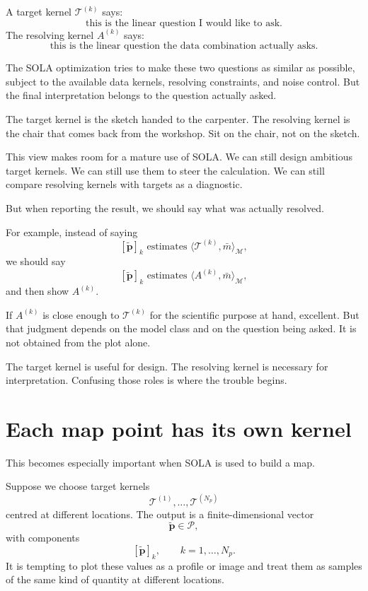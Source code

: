 \documentclass[11pt,openany]{book}
\theoremstyle{definition}
\theoremstyle{remark}
\newcommand{\M}{\mathcal M}
\newcommand{\Pspace}{\mathcal P}
\begin{document}
A target kernel \(\mathcal T^{(k)}\) says:
\[
  \text{this is the linear question I would like to ask.}
\]
The resolving kernel \(A^{(k)}\) says:
\[
  \text{this is the linear question the data combination actually asks.}
\]

The SOLA optimization tries to make these two questions as similar as possible, subject to the
available data kernels, resolving constraints, and noise control. But the final interpretation
belongs to the question actually asked.

\begin{intuitionbox}
The target kernel is the sketch handed to the carpenter. The resolving kernel is the chair that
comes back from the workshop. Sit on the chair, not on the sketch.
\end{intuitionbox}

This view makes room for a mature use of SOLA. We can still design ambitious target kernels.
We can still use them to steer the calculation. We can still compare resolving kernels with
targets as a diagnostic.

But when reporting the result, we should say what was actually resolved.

For example, instead of saying
\[
  [\widetilde{\mathbf p}]_k
  \text{ estimates }
  \langle \mathcal T^{(k)},\bar m\rangle_{\M},
\]
we should say
\[
  [\widetilde{\mathbf p}]_k
  \text{ estimates }
  \langle A^{(k)},\bar m\rangle_{\M},
\]
and then show \(A^{(k)}\).

If \(A^{(k)}\) is close enough to \(\mathcal T^{(k)}\) for the scientific purpose at hand, excellent.
But that judgment depends on the model class and on the question being asked. It is not obtained
from the plot alone.

\begin{warningbox}
The target kernel is useful for design. The resolving kernel is necessary for interpretation.
Confusing those roles is where the trouble begins.
\end{warningbox}

\section{Each map point has its own kernel}

This becomes especially important when SOLA is used to build a map.

Suppose we choose target kernels
\[
  \mathcal T^{(1)},\dots,\mathcal T^{(N_p)}
\]
centred at different locations. The output is a finite-dimensional vector
\[
  \widetilde{\mathbf p}\in\Pspace,
\]
with components
\[
  [\widetilde{\mathbf p}]_k,
  \qquad k=1,\dots,N_p.
\]
It is tempting to plot these values as a profile or image and treat them as samples of the same
kind of quantity at different locations.
\end{document}
